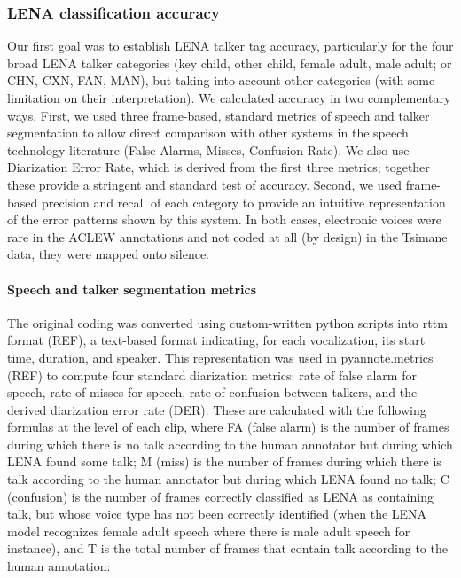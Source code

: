 \documentclass[english,floatsintext,man]{apa6}
\begin{document}
\subsubsection{LENA classification
accuracy}\label{lena-classification-accuracy}

Our first goal was to establish LENA talker tag accuracy, particularly
for the four broad LENA talker categories (key child, other child,
female adult, male adult; or CHN, CXN, FAN, MAN), but taking into
account other categories (with some limitation on their interpretation).
We calculated accuracy in two complementary ways. First, we used three
frame-based, standard metrics of speech and talker segmentation to allow
direct comparison with other systems in the speech technology literature
(False Alarms, Misses, Confusion Rate). We also use Diarization Error
Rate, which is derived from the first three metrics; together these
provide a stringent and standard test of accuracy. Second, we used
frame-based precision and recall of each category to provide an
intuitive representation of the error patterns shown by this system. In
both cases, electronic voices were rare in the ACLEW annotations and not
coded at all (by design) in the Tsimane data, they were mapped onto
silence.

\paragraph{Speech and talker segmentation
metrics}\label{speech-and-talker-segmentation-metrics}

The original coding was converted using custom-written python scripts
into rttm format (REF), a text-based format indicating, for each
vocalization, its start time, duration, and speaker. This representation
was used in pyannote.metrics (REF) to compute four standard diarization
metrics: rate of false alarm for speech, rate of misses for speech, rate
of confusion between talkers, and the derived diarization error rate
(DER). These are calculated with the following formulas at the level of
each clip, where FA (false alarm) is the number of frames during which
there is no talk according to the human annotator but during which LENA
found some talk; M (miss) is the number of frames during which there is
talk according to the human annotator but during which LENA found no
talk; C (confusion) is the number of frames correctly classified as LENA
as containing talk, but whose voice type has not been correctly
identified (when the LENA model recognizes female adult speech where
there is male adult speech for instance), and T is the total number of
frames that contain talk according to the human annotation:
\end{document}
